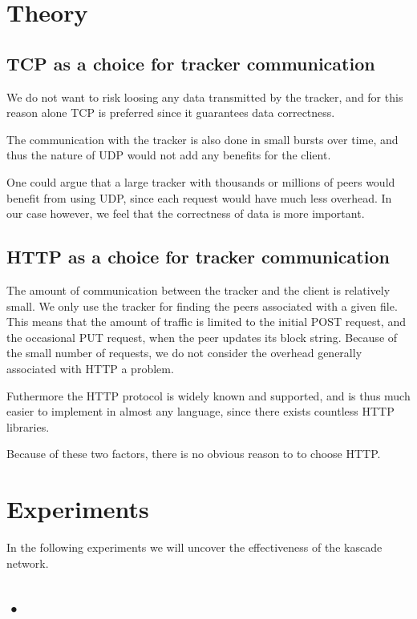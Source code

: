 \documentclass{acm_proc_article-sp}
\begin{document}

\section{Theory}

\subsection{TCP as a choice for tracker communication}
We do not want to risk loosing any data transmitted by the tracker, and for this reason alone TCP is preferred since it guarantees data correctness.

The communication with the tracker is also done in small bursts over time, and thus the nature of UDP would not add any benefits for the client.

One could argue that a large tracker with thousands or millions of peers would benefit from using UDP, since each request would have much less overhead. In our case however, we feel that the correctness of data is more important.

\subsection{HTTP as a choice for tracker communication}
The amount of communication between the tracker and the client is relatively small. We only use the tracker for finding the peers associated with a given file. This means that the amount of traffic is limited to the initial POST request, and the occasional PUT request, when the peer updates its block string. Because of the small number of requests, we do not consider the overhead generally associated with HTTP a problem.

Futhermore the HTTP protocol is widely known and supported, and is thus much easier to implement in almost any language, since there exists countless HTTP libraries. 

Because of these two factors, there is no obvious reason to to choose HTTP.

\section{Experiments}
In the following experiments we will uncover the effectiveness of the kascade network.

\subsection{•}
\end{document}
